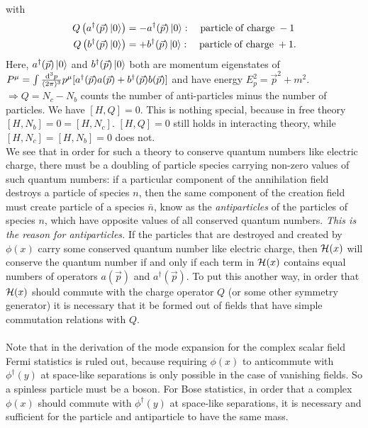 with 
\begin{align}
	Q\left(a^{\dagger} (\vec{p}) \ket{0}\right) &= - a^{\dagger} (\vec{p}) \ket{0}: \quad \mathrm{particle \; of \; charge\; -1}\\
	Q\left(b^{\dagger} (\vec{p}) \ket{0}\right) &= + b^{\dagger} (\vec{p}) \ket{0}: \quad \mathrm{particle \; of \; charge\; +1}.
\end{align}
Here, $a^{\dagger}(\vec{p})\ket{0}$ and $b^{\dagger}(\vec{p})\ket{0}$ both are momentum eigenstates of $P^{\mu} = \int \frac{\mathrm{d}^3 p}{(2 \pi)^3} p^{\mu} [a^{\dagger}(\vec{p}) a(\vec{p}) + b^{\dagger}(\vec{p}) b(\vec{p}) ]$ and have energy $E^2_p = \vec{p}^2+m^2$.\\
$\Rightarrow Q=N_c - N_b$ counts the number of anti-particles minus the number of particles. We have $[H,Q]=0$. This is nothing special, because in free theory $[H,N_b]=0=[H,N_c]$.  $[H,Q]=0$ still holds in interacting theory, while $[H,N_c] = [H,N_b]=0$ does not.\\
We see that in order for such a theory to conserve quantum numbers like electric charge, there must be a doubling of particle species carrying non-zero values of such quantum numbers: if a particular component of the annihilation field destroys a particle of species $n$, then the same component of the creation field must create particle of a species $\bar{ n}$, know as the \emph{antiparticles} of the particles of species $n$, which have opposite values of all conserved quantum numbers. \emph{This is the reason for antiparticles.} If the particles that are destroyed and created by $\phi(x)$ carry some conserved quantum number like electric charge, then $\mathcal{H}(x)$ will conserve the quantum number if and only if each term in $\mathcal{H}(x)$ contains equal numbers of operators $a(\vec{p})$ and $a^\dagger(\vec{p})$. To put this another way, in order that $\mathcal{H}(x)$ should commute with the charge operator $Q$ (or some other symmetry generator) it is necessary that it be formed out of fields that have simple commutation relations with $Q$.\\
\\
Note that in the derivation of the mode expansion for the complex scalar field Fermi statistics is ruled out, because requiring $\phi(x)$ to anticommute with $\phi^\dagger(y)$ at space-like separations is only possible in the case of vanishing fields. So a spinless particle must be a boson. For Bose statistics, in order that a complex $\phi(x)$ should commute with $\phi^\dagger(y)$ at space-like separations, it is necessary and sufficient for the particle and antiparticle to have the same mass.


